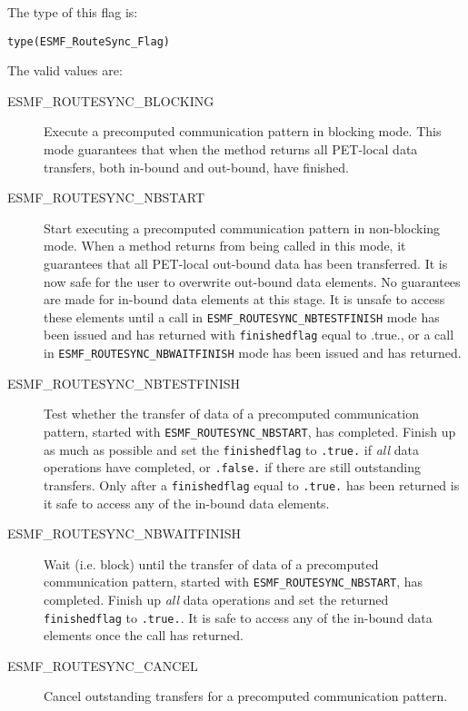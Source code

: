 The type of this flag is:

{\tt type(ESMF\_RouteSync\_Flag)}

The valid values are:
\begin{description}

\item [ESMF\_ROUTESYNC\_BLOCKING]
         Execute a precomputed communication pattern in blocking mode. This
         mode guarantees that when the method returns all PET-local data
         transfers, both in-bound and out-bound, have finished. 
\item [ESMF\_ROUTESYNC\_NBSTART]
         \begin{sloppypar}
         Start executing a precomputed communication pattern in non-blocking
         mode. When a method returns from being called in this mode, it
         guarantees that all PET-local out-bound data has been transferred.
         It is now safe for the user to overwrite out-bound data elements.
         No guarantees are made for in-bound data elements at this stage. It is
         unsafe to access these elements until a call in
         {\tt ESMF\_ROUTESYNC\_NBTESTFINISH} mode has been issued and has returned
         with {\tt finishedflag} equal to .true., or a call in
         {\tt ESMF\_ROUTESYNC\_NBWAITFINISH} mode has been issued and has returned.
         \end{sloppypar}
\item [ESMF\_ROUTESYNC\_NBTESTFINISH]
         Test whether the transfer of data of a precomputed communication
         pattern, started with {\tt ESMF\_ROUTESYNC\_NBSTART}, has completed.
         Finish up as much as possible and set the {\tt finishedflag} to 
         {\tt .true.} if {\em all} data operations have completed, or
         {\tt .false.} if there are still outstanding transfers. Only after
         a {\tt finishedflag} equal to {\tt .true.} has been returned is it
         safe to access any of the in-bound data elements.
\item [ESMF\_ROUTESYNC\_NBWAITFINISH]
         Wait (i.e. block) until the transfer of data of a precomputed
         communication pattern, started with {\tt ESMF\_ROUTESYNC\_NBSTART}, has
         completed. Finish up {\em all} data operations and set the returned 
         {\tt finishedflag} to {\tt .true.}. It is safe to access any of the
         in-bound data elements once the call has returned.
\item [ESMF\_ROUTESYNC\_CANCEL]
         Cancel outstanding transfers for a precomputed communication pattern.
\end{description}


